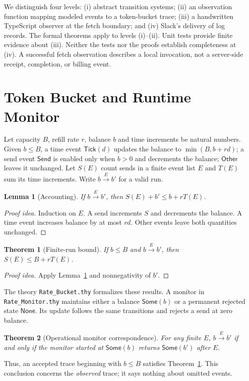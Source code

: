 \documentclass[10pt,twocolumn]{article}
\newtheorem{theorem}{Theorem}
\newtheorem{lemma}{Lemma}
\newcommand{\send}{\mathsf{Send}}
\newcommand{\other}{\mathsf{Other}}
\newcommand{\tick}{\mathsf{Tick}}
\begin{document}
We distinguish four levels: (i) abstract transition systems; (ii) an observation function mapping modeled events to a token-bucket trace; (iii) a handwritten TypeScript observer at the fetch boundary; and (iv) Slack's delivery of log records. The formal theorems apply to levels (i)--(ii). Unit tests provide finite evidence about (iii). Neither the tests nor the proofs establish completeness at (iv). A successful fetch observation describes a local invocation, not a server-side receipt, completion, or billing event.

\section{Token Bucket and Runtime Monitor}
Let capacity $B$, refill rate $r$, balance $b$ and time increments be natural numbers. Given $b\leq B$, a time event $\tick(d)$ updates the balance to $\min(B,b+rd)$; a send event $\send$ is enabled only when $b>0$ and decrements the balance; $\other$ leaves it unchanged. Let $S(E)$ count sends in a finite event list $E$ and $T(E)$ sum its time increments. Write $b\xrightarrow{E}b'$ for a valid run.

\begin{lemma}[Accounting]\label{lem:account}
If $b\xrightarrow{E}b'$, then $S(E)+b'\leq b+rT(E)$.
\end{lemma}
\begin{proof}[Proof idea]
Induction on $E$. A send increments $S$ and decrements the balance. A time event increases balance by at most $rd$. Other events leave both quantities unchanged.
\end{proof}
\begin{theorem}[Finite-run bound]\label{thm:bucket}
If $b\leq B$ and $b\xrightarrow{E}b'$, then $S(E)\leq B+rT(E)$.
\end{theorem}
\begin{proof}[Proof idea]
Apply Lemma~\ref{lem:account} and nonnegativity of $b'$.
\end{proof}
The theory \texttt{Rate\_Bucket.thy} formalizes these results. A monitor in \texttt{Rate\_Monitor.thy} maintains either a balance $\mathsf{Some}(b)$ or a permanent rejected state $\mathsf{None}$. Its update follows the same transitions and rejects a send at zero balance.
\begin{theorem}[Operational monitor correspondence]\label{thm:monitor}
For any finite $E$, $b\xrightarrow{E}b'$ if and only if the monitor started at $\mathsf{Some}(b)$ returns $\mathsf{Some}(b')$ after $E$.
\end{theorem}
Thus, an accepted trace beginning with $b\leq B$ satisfies Theorem~\ref{thm:bucket}. This conclusion concerns the \emph{observed} trace; it says nothing about omitted events.
\end{document}
